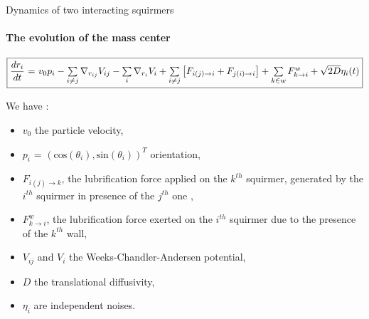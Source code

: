 \documentclass{beamer}
\begin{document}
\begin{frame}{Dynamics of two interacting squirmers}
        \framesubtitle{The evolution of the mass center}
    \begin{center}
        \footnotesize
        $\boxed{\frac{dr_i}{dt}$ = $v_0 p_i -  \sum\limits_{i \ne j}\nabla_{r_{ij}} V_{ij} - \sum\limits_{i}\nabla_{r_i} V_i + \sum\limits_{i\ne j}\left[F_{i(j)\rightarrow i} + F_{j(i)\rightarrow i}\right]+ \sum\limits_{k \in w}F_{k\rightarrow i}^w + \sqrt{2D}\eta_i(t)}$
    \end{center}
    \normalsize
    We have : \begin{itemize}
        \item $v_0$ the particle velocity,
    \item $p_i$ = $(\mathrm{cos}(\theta_i),\mathrm{sin}(\theta_i))^T$ orientation,
    \item $F_{i(j)\rightarrow k}$, the lubrification force applied on the $k^{th}$ squirmer, generated by the $i^{th}$ squirmer in presence of the $j^{th}$ one \cite{Brumley},
    \item $F^w_{k\rightarrow i}$, the lubrification force exerted on the $i^{th}$ squirmer due to the presence of the $k^{th}$ wall\cite{Brumley},
    \item $V_{ij}$ and $V_i$ the Weeks-Chandler-Andersen potential,
    \item $D$ the translational diffusivity,
    \item $\eta_i$ are independent noises. 
    \end{itemize}
\end{frame}
    
\end{document}
